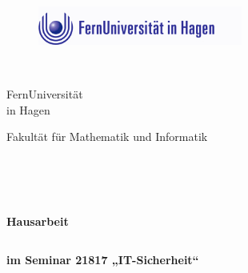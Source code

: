 \thispagestyle{empty}

\begin{figure}[t]
 \centering
 \includegraphics[width=0.6\textwidth]{abbildungen/feulogo}
\end{figure}


\begin{verbatim}


\end{verbatim}

\begin{center}
\Large{FernUniversität }\\
\Large{in Hagen}\\
\end{center}


\begin{center}
\Large{Fakultät für Mathematik und Informatik}
\end{center}
\begin{verbatim}




\end{verbatim}
\begin{center}
\doublespacing
\textbf{\LARGE{Hausarbeit}}\\
\singlespacing
\begin{verbatim}

\end{verbatim}
\textbf{{im Seminar 21817 „IT-Sicherheit“}}
\end{center}
\begin{verbatim}

\end{verbatim}
\begin{center}

\end{center}
\begin{verbatim}

\end{verbatim}




